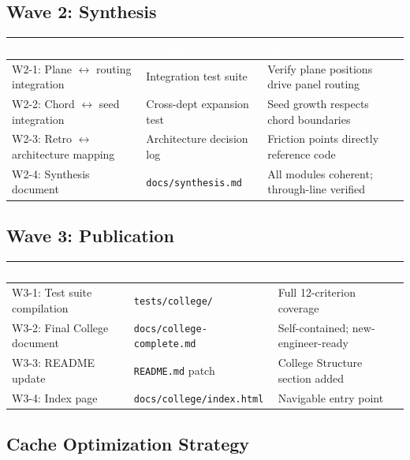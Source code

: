 \documentclass[11pt,letterpaper]{article}
\newcommand{\tableheader}[1]{\textbf{\sffamily\textcolor{white}{#1}}}
\begin{document}
\subsection{Wave 2: Synthesis}

\begin{center}
\begin{tabularx}{\textwidth}{L{3cm}L{3cm}X}
\toprule
{}
\tableheader{Task} & \tableheader{Output} & \tableheader{Notes} \\
\midrule
W2-1: Plane $\leftrightarrow$ routing integration & Integration test suite & Verify plane positions drive panel routing \\
W2-2: Chord $\leftrightarrow$ seed integration & Cross-dept expansion test & Seed growth respects chord boundaries \\
W2-3: Retro $\leftrightarrow$ architecture mapping & Architecture decision log & Friction points directly reference code \\
W2-4: Synthesis document & \texttt{docs/synthesis.md} & All modules coherent; through-line verified \\
\bottomrule
\end{tabularx}
\end{center}

\subsection{Wave 3: Publication}

\begin{center}
\begin{tabularx}{\textwidth}{L{3cm}L{3cm}X}
\toprule
{}
\tableheader{Task} & \tableheader{Output} & \tableheader{Notes} \\
\midrule
W3-1: Test suite compilation & \texttt{tests/college/} & Full 12-criterion coverage \\
W3-2: Final College document & \texttt{docs/college-complete.md} & Self-contained; new-engineer-ready \\
W3-3: README update & \texttt{README.md} patch & College Structure section added \\
W3-4: Index page & \texttt{docs/college/index.html} & Navigable entry point \\
\bottomrule
\end{tabularx}
\end{center}

\subsection{Cache Optimization Strategy}
\end{document}

